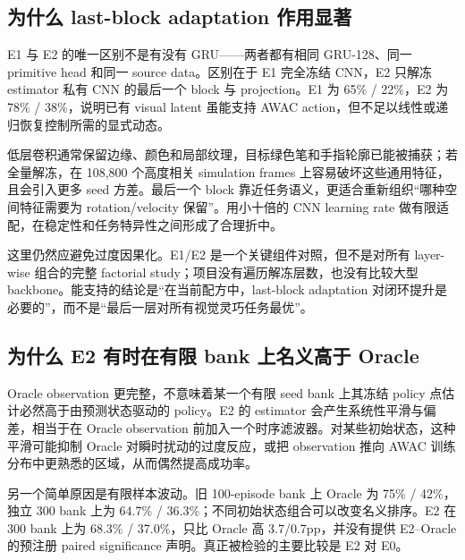 \hypertarget{ux4e3aux4ec0ux4e48-last-block-adaptation-ux4f5cux7528ux663eux8457}{%
\subsection{为什么 last-block adaptation 作用显著}\label{ux4e3aux4ec0ux4e48-last-block-adaptation-ux4f5cux7528ux663eux8457}}

E1 与 E2 的唯一区别不是有没有 GRU------两者都有相同 GRU-128、同一 primitive head 和同一 source data。区别在于 E1 完全冻结 CNN，E2 只解冻 estimator 私有 CNN 的最后一个 block 与 projection。E1 为 65\% / 22\%，E2 为 78\% / 38\%，说明已有 visual latent 虽能支持 AWAC action，但不足以线性或递归恢复控制所需的显式动态。

低层卷积通常保留边缘、颜色和局部纹理，目标绿色笔和手指轮廓已能被捕获；若全量解冻，在 108,800 个高度相关 simulation frames 上容易破坏这些通用特征，且会引入更多 seed 方差。最后一个 block 靠近任务语义，更适合重新组织``哪种空间特征需要为 rotation/velocity 保留''。用小十倍的 CNN learning rate 做有限适配，在稳定性和任务特异性之间形成了合理折中。

这里仍然应避免过度因果化。E1/E2 是一个关键组件对照，但不是对所有 layer-wise 组合的完整 factorial study；项目没有遍历解冻层数，也没有比较大型 backbone。能支持的结论是``在当前配方中，last-block adaptation 对闭环提升是必要的''，而不是``最后一层对所有视觉灵巧任务最优''。

\hypertarget{ux4e3aux4ec0ux4e48-e2-ux6709ux65f6ux5728ux6709ux9650-bank-ux4e0aux540dux4e49ux9ad8ux4e8e-oracle}{%
\subsection{为什么 E2 有时在有限 bank 上名义高于 Oracle}\label{ux4e3aux4ec0ux4e48-e2-ux6709ux65f6ux5728ux6709ux9650-bank-ux4e0aux540dux4e49ux9ad8ux4e8e-oracle}}

Oracle observation 更完整，不意味着某一个有限 seed bank 上其冻结 policy 点估计必然高于由预测状态驱动的 policy。E2 的 estimator 会产生系统性平滑与偏差，相当于在 Oracle observation 前加入一个时序滤波器。对某些初始状态，这种平滑可能抑制 Oracle 对瞬时扰动的过度反应，或把 observation 推向 AWAC 训练分布中更熟悉的区域，从而偶然提高成功率。

另一个简单原因是有限样本波动。旧 100-episode bank 上 Oracle 为 75\% / 42\%，独立 300 bank 上为 64.7\% / 36.3\%；不同初始状态组合可以改变名义排序。E2 在 300 bank 上为 68.3\% / 37.0\%，只比 Oracle 高 3.7/0.7pp，并没有提供 E2--Oracle 的预注册 paired significance 声明。真正被检验的主要比较是 E2 对 E0。

